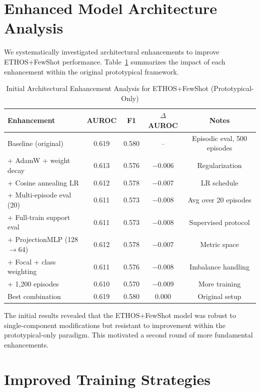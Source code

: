 \section{Enhanced Model Architecture Analysis}

We systematically investigated architectural enhancements to improve ETHOS+FewShot performance. Table~\ref{tab:architecture_ablation} summarizes the impact of each enhancement within the original prototypical framework.

\begin{table}[htbp]
\centering
\caption{Initial Architectural Enhancement Analysis for ETHOS+FewShot (Prototypical-Only)}
\small
\begin{tabular}{lcccc}
\toprule
Enhancement & AUROC & F1 & $\Delta$AUROC & Notes \\
\midrule
Baseline (original) & 0.619 & 0.580 & -- & Episodic eval, 500 episodes \\
+ AdamW + weight decay & 0.613 & 0.576 & $-$0.006 & Regularization \\
+ Cosine annealing LR & 0.612 & 0.578 & $-$0.007 & LR schedule \\
+ Multi-episode eval (20) & 0.611 & 0.573 & $-$0.008 & Avg over 20 episodes \\
+ Full-train support eval & 0.611 & 0.573 & $-$0.008 & Supervised protocol \\
+ ProjectionMLP (128$\to$64) & 0.612 & 0.578 & $-$0.007 & Metric space \\
+ Focal + class weighting & 0.611 & 0.576 & $-$0.008 & Imbalance handling \\
+ 1,200 episodes & 0.610 & 0.570 & $-$0.009 & More training \\
\midrule
Best combination & 0.619 & 0.580 & 0.000 & Original setup \\
\bottomrule
\end{tabular}
\label{tab:architecture_ablation}
\end{table}

The initial results revealed that the ETHOS+FewShot model was robust to single-component modifications but resistant to improvement within the prototypical-only paradigm. This motivated a second round of more fundamental enhancements.

\section{Improved Training Strategies}
\label{sec:improved-training}

